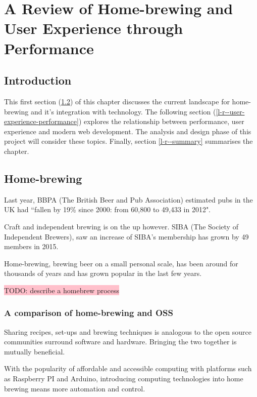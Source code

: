 \chapter{A Review of Home-brewing and User Experience through Performance} \label{l-r}

\section{Introduction} \label{l-r--introduction}

This first section (\ref{l-r--home-brewing}) of this chapter discusses the current landscape for home-brewing and it's integration with technology. The following section (\ref{l-r--user-experience-performance}) explores the relationship between performance, user experience and modern web development. The analysis and design phase of this project will consider these topics. Finally, section \ref{l-r--summary} summarises the chapter.

\section{Home-brewing} \label{l-r--home-brewing}

Last year, BBPA (The British Beer and Pub Association) estimated pubs in the UK had ``fallen by 19\% since 2000: from 60,800 to 49,433 in 2012". \cite{BBPA}

Craft and independent brewing is on the up however. SIBA (The Society of Independent Brewers), saw an increase of  SIBA’s membership has grown by 49 members in 2015. \cite{SIBA}

Home-brewing, brewing beer on a small personal scale, has been around for thousands of years and has grown popular in the last few years. %

\colorbox{pink}{TODO: describe a homebrew process} %

\subsection{A comparison of home-brewing and OSS} \label{l-r--compare-home-brewing-and-oss}

Sharing recipes, set-ups and brewing techniques is analogous to the open source communities surround software and hardware. Bringing the two together is mutually beneficial.

With the popularity of affordable and accessible computing with platforms such as Raspberry PI and Arduino, introducing computing technologies into home brewing means more automation and control.

